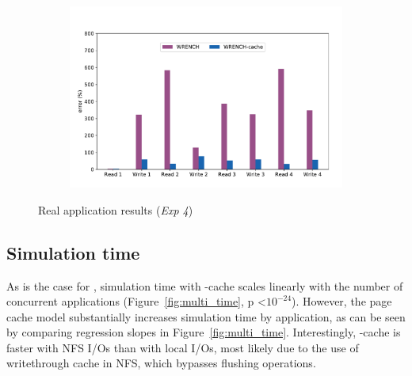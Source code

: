 \begin{figure}[!ht]
    \begin{subfigure}{0.95\linewidth}
        \centering
        \includegraphics[width=\linewidth]{result/nighres/figures/nighres_errors.pdf}
    \end{subfigure}
    \caption{Real application results (\textit{Exp 4})}
    \label{fig:nighres}
\end{figure}

\subsection{Simulation time}

As is the case for \wrench, simulation time with \wrench-cache scales
linearly with the number of concurrent applications
(Figure~\ref{fig:multi_time}, p \textless $10^{-24}$). However, the page
cache model substantially increases simulation time by
application, as can be seen by comparing regression slopes in
Figure~\ref{fig:multi_time}. Interestingly, \wrench-cache is faster with 
NFS I/Os than with local I/Os, most likely due to the use of writethrough
cache in NFS, which bypasses flushing operations.

